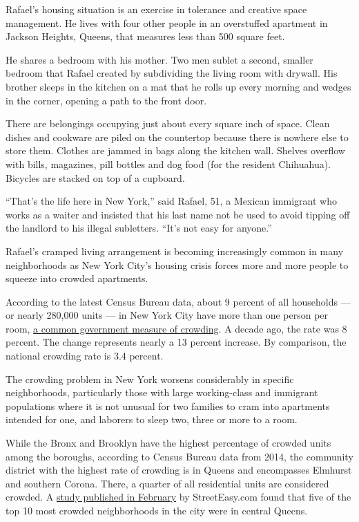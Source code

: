 Rafael's housing situation is an exercise in tolerance and creative
space management. He lives with four other people in an overstuffed
apartment in Jackson Heights, Queens, that measures less than 500 square
feet.

He shares a bedroom with his mother. Two men sublet a second, smaller
bedroom that Rafael created by subdividing the living room with drywall.
His brother sleeps in the kitchen on a mat that he rolls up every
morning and wedges in the corner, opening a path to the front door.

There are belongings occupying just about every square inch of space.
Clean dishes and cookware are piled on the countertop because there is
nowhere else to store them. Clothes are jammed in bags along the kitchen
wall. Shelves overflow with bills, magazines, pill bottles and dog food
(for the resident Chihuahua). Bicycles are stacked on top of a cupboard.

``That's the life here in New York,'' said Rafael, 51, a Mexican
immigrant who works as a waiter and insisted that his last name not be
used to avoid tipping off the landlord to his illegal subletters. ``It's
not easy for anyone.''

Rafael's cramped living arrangement is becoming increasingly common in
many neighborhoods as New York City's housing crisis forces more and
more people to squeeze into crowded apartments.

According to the latest Census Bureau data, about 9 percent of all
households --- or nearly 280,000 units --- in New York City have more
than one person per room,
\href{https://www.huduser.gov/publications/pdf/measuring_overcrowding_in_hsg.pdf}{a
common government measure of crowding}. A decade ago, the rate was 8
percent. The change represents nearly a 13 percent increase. By
comparison, the national crowding rate is 3.4 percent.

The crowding problem in New York worsens considerably in specific
neighborhoods, particularly those with large working-class and immigrant
populations where it is not unusual for two families to cram into
apartments intended for one, and laborers to sleep two, three or more to
a room.

While the Bronx and Brooklyn have the highest percentage of crowded
units among the boroughs, according to Census Bureau data from 2014, the
community district with the highest rate of crowding is in Queens and
encompasses Elmhurst and southern Corona. There, a quarter of all
residential units are considered crowded. A
\href{http://streeteasy.com/blog/doubled-up-crowding-in-nyc/}{study
published in February} by StreetEasy.com found that five of the top 10
most crowded neighborhoods in the city were in central Queens.

